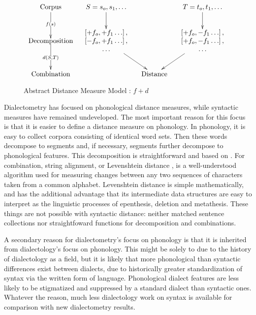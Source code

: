 \begin{figure}
\[\xymatrix@C=1pc{
 \textrm{Corpus} \ar@{>}[d]|{f(s)} &
  S = s_o,s_1,\ldots
  \ar@{>}[d] %
  &&
  T = t_o,t_1,\ldots
  \ar@{>}[d] %
  \\
 *\txt{Decomposition} \ar@{>}[d]|{d(S,T)} &
 *{\begin{array}{c}
     \left[ + f_o, +f_1 \ldots \right], \\
     \left[ - f_o, +f_1 \ldots \right], \\
     \ldots \\ \end{array}}
 \ar@{>}[dr]
 &&
 *{\begin{array}{c}
     \left[ + f_o, -f_1 \ldots \right], \\
     \left[ + f_o, -f_1 \ldots \right], \\
     \ldots \\ \end{array}}
 \ar@{>}[dl]  \\
 \textrm{Combination} &
 & \textrm{Distance} & \\
} \]
\label{abstract-distance-measure-model}
\caption{Abstract Distance Measure Model : $f + d$}
\end{figure}

Dialectometry has focused on phonological distance measures, while
syntactic measures have remained undeveloped. The most important
reason for this focus is that it is easier to define a distance
measure on phonology. In phonology, it is easy to collect corpora
consisting of identical word sets. Then these words decompose to segments and,
if necessary, segments further decompose to phonological
features. This decomposition is straightforward and based on
. For combination, string alignment, or Levenshtein
distance \cite{lev65}, is a well-understood algorithm used for
measuring changes between any two sequences of characters taken from a
common alphabet. Levenshtein distance is simple mathematically, and
has the additional advantage that its intermediate data structures are
easy to interpret as the linguistic processes of epenthesis, deletion and
metathesis. These things are not possible
with syntactic distance: neither matched sentence collections nor
straightfoward functions for decomposition and combinations.

A secondary reason for dialectometry's focus on phonology is that it
is inherited from dialectology's focus on phonology.
This might be solely to due to the history of dialectology as a field, but it is
likely that more phonological than syntactic differences exist between
dialects, due to historically greater standardization
of syntax via the written form of language. Phonological
dialect features are less likely to be stigmatized and suppressed by a
standard dialect than syntactic ones.
Whatever the reason, much less dialectology work on syntax is
available for comparison with new dialectometry results.

